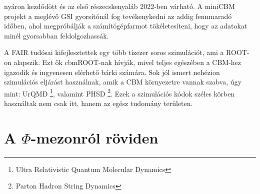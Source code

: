 \documentclass[a4paper,12pt]{article}
\begin{document}
nyáron kezdődött és az első részecskenyaláb 2022-ben várható. A miniCBM projekt a meglévő GSI gyorsítónál fog tevékenykedni az addig fennmaradó
időben, ahol megpróbálják a számítógépfarmot tökéletesíteni, hogy az adatokat minél gyorsabban feldolgozhassák.
\vspace{5mm}
\par A FAIR tudósai kifejlesztettek egy több tízezer soros szimulációt, ami a ROOT-on alapszik. Ezt ők cbmROOT-nak hívják, mivel teljes
egészében a CBM-hez igazodik és ingyenesen elérhető bárki számára. Sok jól ismert nehézion szimulációs eljárást használnak, amik a CBM
környezetre vannak szabva, úgy mint: UrQMD \footnote{ Ultra Relativistic Quantum Molecular Dynamics }, valamint  PHSD \footnote{ Parton Hadron String Dynamics }.
 Ezek a szimulációs kódok széles körben használtak nem csak itt, hanem az egész tudomány területen. 
\section{ A $\Phi$-mezonról röviden}
\end{document}
